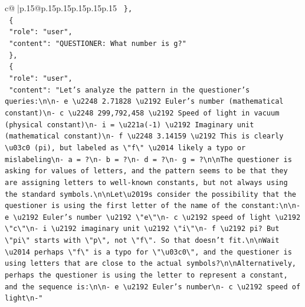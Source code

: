 \documentclass{article}
\begin{document}
{\begin{supertabular}{c@{$\;$}|p{.15\linewidth}@{}p{.15\linewidth}p{.15\linewidth}p{.15\linewidth}p{.15\linewidth}p{.15\linewidth}}
{{{\texttt{  \},} \\
\texttt{  \{} \\
\texttt{    "role": "user",} \\
\texttt{    "content": "QUESTIONER: What number is g?"} \\
\texttt{  \},} \\
\texttt{  \{} \\
\texttt{    "role": "user",} \\
\texttt{    "content": "Let's analyze the pattern in the questioner's queries:\textbackslash{}n\textbackslash{}n{-} e \textbackslash{}u2248 2.71828 \textbackslash{}u2192 Euler's number (mathematical constant)\textbackslash{}n{-} c \textbackslash{}u2248 299,792,458 \textbackslash{}u2192 Speed of light in vacuum (physical constant)\textbackslash{}n{-} i = \textbackslash{}u221a({-}1) \textbackslash{}u2192 Imaginary unit (mathematical constant)\textbackslash{}n{-} f \textbackslash{}u2248 3.14159 \textbackslash{}u2192 This is clearly \textbackslash{}u03c0 (pi), but labeled as \textbackslash{}"f\textbackslash{}" \textbackslash{}u2014 likely a typo or mislabeling\textbackslash{}n{-} a = ?\textbackslash{}n{-} b = ?\textbackslash{}n{-} d = ?\textbackslash{}n{-} g = ?\textbackslash{}n\textbackslash{}nThe questioner is asking for values of letters, and the pattern seems to be that they are assigning letters to well{-}known constants, but not always using the standard symbols.\textbackslash{}n\textbackslash{}nLet\textbackslash{}u2019s consider the possibility that the questioner is using the first letter of the name of the constant:\textbackslash{}n\textbackslash{}n{-} e \textbackslash{}u2192 Euler's number \textbackslash{}u2192 \textbackslash{}"e\textbackslash{}"\textbackslash{}n{-} c \textbackslash{}u2192 speed of light \textbackslash{}u2192 \textbackslash{}"c\textbackslash{}"\textbackslash{}n{-} i \textbackslash{}u2192 imaginary unit \textbackslash{}u2192 \textbackslash{}"i\textbackslash{}"\textbackslash{}n{-} f \textbackslash{}u2192 pi? But \textbackslash{}"pi\textbackslash{}" starts with \textbackslash{}"p\textbackslash{}", not \textbackslash{}"f\textbackslash{}". So that doesn't fit.\textbackslash{}n\textbackslash{}nWait \textbackslash{}u2014 perhaps \textbackslash{}"f\textbackslash{}" is a typo for \textbackslash{}"\textbackslash{}u03c0\textbackslash{}", and the questioner is using letters that are close to the actual symbols?\textbackslash{}n\textbackslash{}nAlternatively, perhaps the questioner is using the letter to represent a constant, and the sequence is:\textbackslash{}n\textbackslash{}n{-} e \textbackslash{}u2192 Euler's number\textbackslash{}n{-} c \textbackslash{}u2192 speed of light\textbackslash{}n{-}"} \\
}}}
\end{supertabular}}
\end{document}
